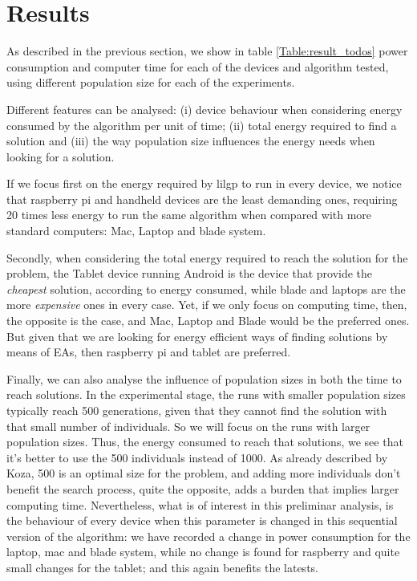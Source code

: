 \section{Results}
\label{results}

As described in the previous section, we show in table \ref{Table:result_todos} power consumption and computer time for each of the devices and algorithm tested, using different population size for each of the experiments.  

Different features can be analysed:  (i) device behaviour when considering energy consumed by the algorithm per unit of time; (ii) total energy required to find a solution and (iii) the way population size influences the energy needs when looking for a solution.

If we focus first on the energy required by lilgp to run in every device, we notice that raspberry pi and handheld devices are the least demanding ones, requiring 20 times less energy to run the same algorithm when compared with more standard computers:  Mac, Laptop and blade system.

Secondly, when considering the total energy required to reach the solution for the problem, the Tablet device running Android is the device that provide the \textit{cheapest} solution, according to energy consumed, while blade and laptops are the more \textit{expensive} ones in every case.  Yet, if we only focus on computing time, then, the opposite is the case, and Mac, Laptop and Blade would be the preferred ones.  But given that we are looking for energy efficient ways of finding solutions by means of EAs, then raspberry pi and tablet are preferred.

Finally, we can also analyse the influence of population sizes in both the time to reach solutions.  In the experimental stage, the runs with smaller population sizes typically reach 500 generations, given that they cannot find the solution with that small number of individuals.  So we will focus on the runs with larger population sizes.  Thus, the energy consumed to reach that solutions, we see that it's better to use the 500 individuals instead of 1000.  As already described by Koza, 500 is an optimal size for the problem, and adding more individuals don't benefit the search process, quite the opposite, adds a burden that implies larger computing time.  Nevertheless, what is of interest in this preliminar analysis, is the behaviour of every device when this parameter is changed in this sequential version of the algorithm:  we have recorded a change in power consumption for the laptop, mac and blade system, while no change is found for raspberry and quite small changes for the tablet;  and this again benefits the latests.  





